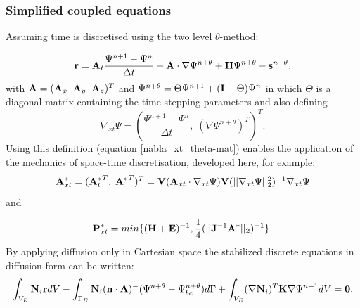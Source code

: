  
\subsubsection{Simplified coupled equations} 

Assuming time is discretised 
using the two level $\theta$-method: 
 
\begin{equation}
{\bf r} = {\bf A}_t \frac{\Psi^{n+1}-\Psi^{n}}{\Delta t} +
{\bf A} \cdot {\nabla} \Psi^{n+\theta}  
+ {\bf H} \Psi^{n+\theta}  
-{\bf s}^{n+\theta} , 
\label{eqn-def-time-disc-mat} 
\end{equation}
with ${\bf A} = ({\bf A}_x \;\; {\bf A}_y\;\; {\bf A}_z)^T$ and 
$\Psi^{n+\theta}=\Theta\Psi^{n+1} + ({\bf I}-\Theta)\Psi^n$ in 
which $\Theta$ is a diagonal matrix containing the time 
stepping parameters and 
also defining 
\begin{equation}
{\nabla_{xt}} \Psi= (\frac{\Psi^{n+1}-\Psi^n}{\Delta t},\;( \nabla  \Psi^{n+\theta})^T)^T. 
\label{nabla_xt_theta-mat} 
\end{equation}  
Using this definition (equation \ref{nabla_xt_theta-mat}) 
enables the application of the 
mechanics of space-time discretisation, developed here, 
for example:   
\begin{equation}
{\bf A}_{xt}^*= ({{\bf A}_t^*}^T ,\; {{\bf A}^*}^T )^T=
 {{\bf V}({\bf A}_{xt}\cdot{\nabla_{xt}} \Psi) }
 { {\bf V}(\vert\vert {\nabla_{xt}} \Psi \vert\vert^2_2)^{-1}} {\nabla_{xt}} \Psi
\label{a*-def-simp-mat} 
\end{equation} 
and
 
\begin{equation}
 {\bf P}_{xt}^* = min\{ ({\bf H}+{\bf E})^{-1}, 
 \frac{1}{4} (\vert\vert {\bf J}^{-1} {\bf A}^* \vert\vert_2 )^{-1} \}. 
\label{p*-def-simp-mat} 
\end{equation} 
 By applying diffusion only in Cartesian space 
 the stabilized discrete equations in diffusion form can be written: 
\begin{equation}
 \int_{V_E} 
 {\bf N}_i {\bf r} d V - \int_{\Gamma_E} {\bf N}_i ({\bf n}\cdot {\bf A})^- (\Psi^{n+\theta}-\Psi_{bc}^{n+\theta}) 
 d \Gamma
 +
 \int_{{V_{E}}} ({\nabla} {\bf N}_i )^T {\bf K}  {\nabla} \Psi^{n+1} d V
 ={\bf 0}. 
\label{discrete-eqn-diff-nu-simple-cartesian-mat} 
\end{equation}




